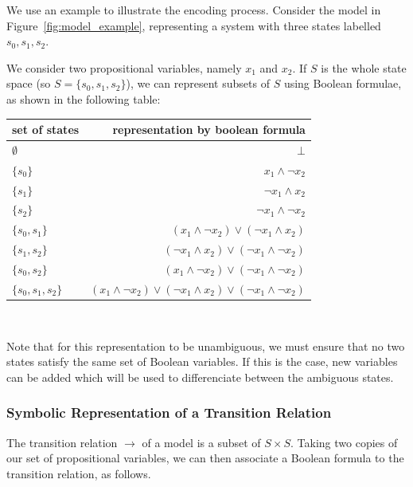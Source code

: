 \documentclass[11pt]{report}
\begin{document}
We use an example \cite{logic_in_computer_science} to illustrate the encoding process.
Consider the model in Figure~\ref {fig:model_example}, representing a system with three states labelled $s_0, s_1, s_2$. 

We consider two propositional variables, namely $x_1$ and $x_2$.  
If $S$ is the whole state space (so $S = \{s_0, s_1, s_2\}$), we can represent subsets of $S$ using Boolean formulae, as shown in the following table:\\

\vspace{0.3cm}
{\centering \begin{tabular}{ l | r }
  set of states & representation by boolean formula \\ \hline
$\emptyset $&   $\bot$ \\
$\{ s_0\}$ & $x_1 \land \lnot x_2 $\\
$\{ s_1\}$ & $ \lnot x_1 \land x_2 $\\
$\{ s_2\}$ & $\lnot x_1 \land \lnot x_2 $\\
$\{ s_0, s_ 1\}$ & $(x_1 \land \lnot x_2) \lor (\lnot x_1 \land x_2)  $\\
$\{ s_1, s_2\}$ & $(\lnot x_1 \land  x_2) \lor (\lnot x_1 \land\lnot x_2)$\\
$\{ s_0, s_2\}$ & $(x_1 \land \lnot x_2) \lor (\lnot x_1 \land\lnot x_2) $\\
$\{ s_0, s_1, s_2\}$ & $(x_1 \land \lnot x_2) \lor (\lnot x_1 \land  x_2) \lor (\lnot x_1 \land\lnot x_2)$
\end{tabular}
\\}
\vspace{0.3cm}



Note that for this representation to be unambiguous, we must ensure that no two states satisfy the same set of Boolean variables. If this is the case, new variables can be added which will be used to differenciate between the ambiguous states.


\subsubsection{Symbolic Representation of a Transition Relation}

The transition relation $\rightarrow$ of a model is a subset of $S \times S$. Taking two copies of our set of propositional variables, we can then associate a Boolean formula to the transition relation, as follows. 
\end{document}
